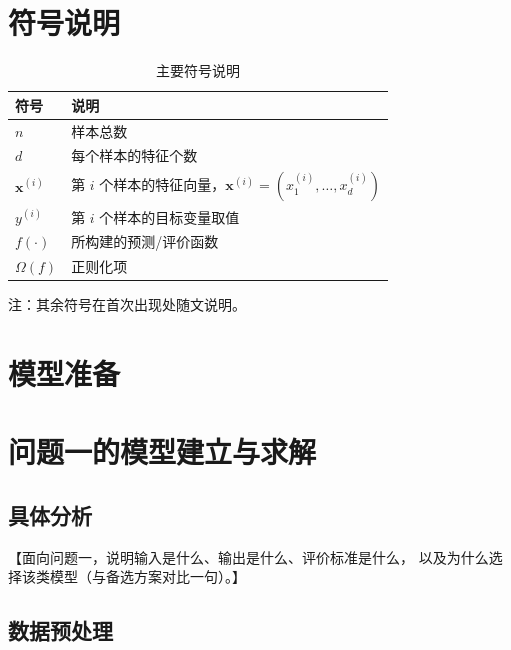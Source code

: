 \documentclass[withoutpreface,bwprint]{cumcmthesis}
\begin{document}
\section{符号说明}

\begin{table}[H]
    \centering
    \caption{主要符号说明}
    \label{tab:symbols}
    \begin{tabularx}{\textwidth}{YL}
        \toprule
        符号 & 说明 \\
        \midrule
        $n$                     & 样本总数 \\
        $d$                     & 每个样本的特征个数 \\
        $\boldsymbol{x}^{(i)}$  & 第 $i$ 个样本的特征向量，$\boldsymbol{x}^{(i)}=(x_1^{(i)},\dots,x_d^{(i)})$ \\
        $y^{(i)}$               & 第 $i$ 个样本的目标变量取值 \\
        $f(\cdot)$              & 所构建的预测/评价函数 \\
        $\Omega(f)$             & 正则化项 \\
        \bottomrule
    \end{tabularx}
\end{table}

注：其余符号在首次出现处随文说明。

\newpage

\section{模型准备}

\section{问题一的模型建立与求解}

\subsection{具体分析}

【面向问题一，说明输入是什么、输出是什么、评价标准是什么，
以及为什么选择该类模型（与备选方案对比一句）。】

\subsection{数据预处理}
\end{document}
